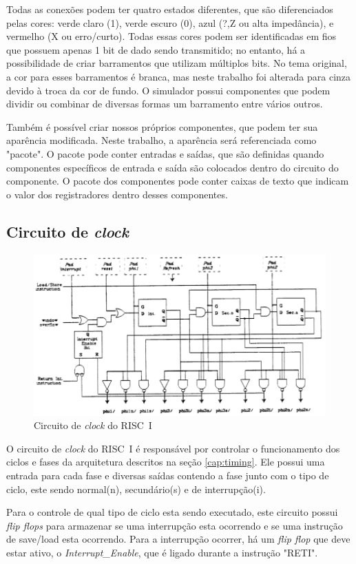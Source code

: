 \documentclass[
	article,			%
	11pt,				%
	oneside,			%
	a4paper,			%
	english,			%
	brazil,				%
	sumario=tradicional
	]{abntex2}
\begin{document}
Todas as conexões podem ter quatro estados diferentes, que são diferenciados pelas cores: verde claro (1), verde escuro (0), azul (?,Z ou alta impedância), e vermelho (X ou erro/curto). Todas essas cores podem ser identificadas em fios que possuem apenas 1 bit de dado sendo transmitido; no entanto, há a possibilidade de criar barramentos que utilizam múltiplos bits. No tema original, a cor para esses barramentos é branca, mas neste trabalho foi alterada para cinza devido à troca da cor de fundo. O simulador possui componentes que podem dividir ou combinar de diversas formas um barramento entre vários outros.

Também é possível criar nossos próprios componentes, que podem ter sua aparência modificada. Neste trabalho, a aparência será referenciada como "pacote". O pacote pode conter entradas e saídas, que são definidas quando componentes específicos de entrada e saída são colocados dentro do circuito do componente. O pacote dos componentes pode conter caixas de texto que indicam o valor dos registradores dentro desses componentes.

\subsection{Circuito de \textit{clock}}\label{cap:clock}
\begin{figure}[H]
    \centering
    \includegraphics[width=0.75\linewidth]{Original/clockPeek.png}
    \caption{Circuito de \textit{clock} do RISC~I \cite{peek_vlsi_1983}}
    \label{fig:clockPeek}    
\end{figure}
O circuito de \textit{clock} do RISC~I é responsável por controlar o funcionamento dos ciclos e fases da arquitetura descritos na seção \ref{cap:timing}. Ele possui uma entrada para cada fase e diversas saídas contendo a fase junto com o tipo de ciclo, este sendo normal(n), secundário(s) e de interrupção(i). 

Para o controle de qual tipo de ciclo esta sendo executado, este circuito possui \textit{flip flops} para armazenar se uma interrupção esta ocorrendo e se uma instrução de save/load esta ocorrendo. Para a interrupção ocorrer, há um \textit{flip flop} que deve estar ativo, o \textit{Interrupt\_Enable}, que é ligado durante a instrução "RETI".
\end{document}
